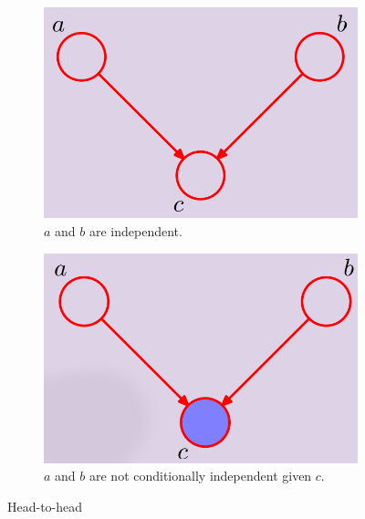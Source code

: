 \begin{figure}[H]
	\centering
	\begin{subfigure}
		[t]{0.49\textwidth}
		\centering
		\includegraphics[width=\linewidth]{
			images/08_BayesianNetworks_headToHeadNoEvidence.png
		}
		\caption{$a$ and $b$ are independent.}
		\label{fig:unSelectedHeadToHead}
	\end{subfigure}
	\hfill
	\begin{subfigure}
		[t]{0.49\textwidth}
		\centering
		\includegraphics[width=\linewidth]{
			images/08_BayesianNetworks_headToHeadEvidence.png
		}
		\caption{$a$ and $b$ are not conditionally independent given $c$.}
		\label{fig:selectedHeadToHead}
	\end{subfigure}

	\caption{Head-to-head}
	\label{fig:head-to-head}
\end{figure}

